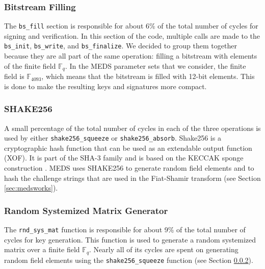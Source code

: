\documentclass[11pt,a4paper]{report}
\theoremstyle{definition}
\begin{document}
\subsubsection{Bitstream Filling}
The \texttt{bs\_fill} section is responsible for about 6\% of the total number of cycles for signing and verification. In this section of the code, multiple calls are made to the \texttt{bs\_init}, \texttt{bs\_write}, and \texttt{bs\_finalize}. We decided to group them together because they are all part of the same operation: filling a bitstream with elements of the finite field $\mathbb{F}_q$. In the MEDS parameter sets that we consider, the finite field is $\mathbb{F}_{4093}$, which means that the bitstream is filled with 12-bit elements. This is done to make the resulting keys and signatures more compact.

\subsubsection{SHAKE256}
\label{sec:shake256}
A small percentage of the total number of cycles in each of the three operations is used by either \texttt{shake256\_squeeze} or \texttt{shake256\_absorb}. Shake256 is a cryptographic hash function that can be used as an extendable output function (XOF). It is part of the SHA-3 family \cite{dworkin2015sha} and is based on the KECCAK sponge construction \cite{bertoni2013keccak}. MEDS uses SHAKE256 to generate random field elements and to hash the challenge strings that are used in the Fiat-Shamir transform (see Section \ref{sec:medsworks}).

\subsubsection{Random Systemized Matrix Generator}
The \texttt{rnd\_sys\_mat} function is responsible for about 9\% of the total number of cycles for key generation. This function is used to generate a random systemized matrix over a finite field $\mathbb{F}_q$. Nearly all of its cycles are spent on generating random field elements using the \texttt{shake256\_squeeze} function (see Section \ref{sec:shake256}).
\end{document}
